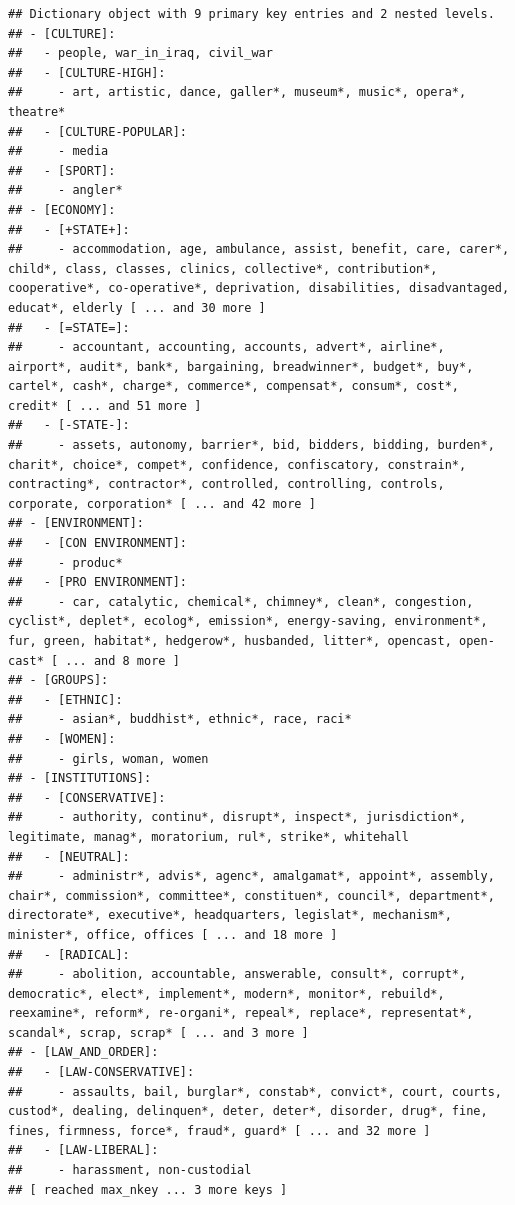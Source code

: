 \documentclass[
]{book}
\begin{document}
\begin{verbatim}
## Dictionary object with 9 primary key entries and 2 nested levels.
## - [CULTURE]:
##   - people, war_in_iraq, civil_war
##   - [CULTURE-HIGH]:
##     - art, artistic, dance, galler*, museum*, music*, opera*, theatre*
##   - [CULTURE-POPULAR]:
##     - media
##   - [SPORT]:
##     - angler*
## - [ECONOMY]:
##   - [+STATE+]:
##     - accommodation, age, ambulance, assist, benefit, care, carer*, child*, class, classes, clinics, collective*, contribution*, cooperative*, co-operative*, deprivation, disabilities, disadvantaged, educat*, elderly [ ... and 30 more ]
##   - [=STATE=]:
##     - accountant, accounting, accounts, advert*, airline*, airport*, audit*, bank*, bargaining, breadwinner*, budget*, buy*, cartel*, cash*, charge*, commerce*, compensat*, consum*, cost*, credit* [ ... and 51 more ]
##   - [-STATE-]:
##     - assets, autonomy, barrier*, bid, bidders, bidding, burden*, charit*, choice*, compet*, confidence, confiscatory, constrain*, contracting*, contractor*, controlled, controlling, controls, corporate, corporation* [ ... and 42 more ]
## - [ENVIRONMENT]:
##   - [CON ENVIRONMENT]:
##     - produc*
##   - [PRO ENVIRONMENT]:
##     - car, catalytic, chemical*, chimney*, clean*, congestion, cyclist*, deplet*, ecolog*, emission*, energy-saving, environment*, fur, green, habitat*, hedgerow*, husbanded, litter*, opencast, open-cast* [ ... and 8 more ]
## - [GROUPS]:
##   - [ETHNIC]:
##     - asian*, buddhist*, ethnic*, race, raci*
##   - [WOMEN]:
##     - girls, woman, women
## - [INSTITUTIONS]:
##   - [CONSERVATIVE]:
##     - authority, continu*, disrupt*, inspect*, jurisdiction*, legitimate, manag*, moratorium, rul*, strike*, whitehall
##   - [NEUTRAL]:
##     - administr*, advis*, agenc*, amalgamat*, appoint*, assembly, chair*, commission*, committee*, constituen*, council*, department*, directorate*, executive*, headquarters, legislat*, mechanism*, minister*, office, offices [ ... and 18 more ]
##   - [RADICAL]:
##     - abolition, accountable, answerable, consult*, corrupt*, democratic*, elect*, implement*, modern*, monitor*, rebuild*, reexamine*, reform*, re-organi*, repeal*, replace*, representat*, scandal*, scrap, scrap* [ ... and 3 more ]
## - [LAW_AND_ORDER]:
##   - [LAW-CONSERVATIVE]:
##     - assaults, bail, burglar*, constab*, convict*, court, courts, custod*, dealing, delinquen*, deter, deter*, disorder, drug*, fine, fines, firmness, force*, fraud*, guard* [ ... and 32 more ]
##   - [LAW-LIBERAL]:
##     - harassment, non-custodial
## [ reached max_nkey ... 3 more keys ]
\end{verbatim}
\end{document}
